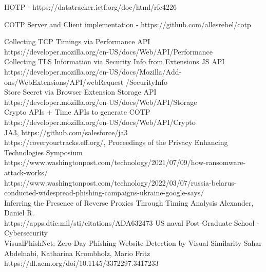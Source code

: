 \documentclass[a4paper, 11pt]{article} 				%
\begin{document}
\noindent
[8]HOTP - https://datatracker.ietf.org/doc/html/rfc4226 

\noindent
[9]COTP Server and Client implementation - https://github.com/allesrebel/cotp

\noindent
[10]Collecting TCP Timings via Performance API\\
https://developer.mozilla.org/en-US/docs/Web/API/Performance\\

\noindent
[11]Collecting TLS Information via Security Info from Extensions JS API\\
https://developer.mozilla.org/en-US/docs/Mozilla/Add-ons/WebExtensions/API/webRequest /SecurityInfo\\

\noindent
[12]Store Secret via Browser Extension Storage API\\
https://developer.mozilla.org/en-US/docs/Web/API/Storage\\

\noindent
[13]Crypto APIs + Time APIs to generate COTP\\
https://developer.mozilla.org/en-US/docs/Web/API/Crypto\\


\noindent
[14]JA3, https://github.com/salesforce/ja3\\

\noindent
[15]https://coveryourtracks.eff.org/, Proceedings of the Privacy Enhancing Technologies Symposium\\

\noindent
[16]https://www.washingtonpost.com/technology/2021/07/09/how-ransomware-attack-works/\\

\noindent
[17]https://www.washingtonpost.com/technology/2022/03/07/russia-belarus-conducted-widespread-phishing-campaigns-ukraine-google-says/\\

\noindent
[18]Inferring the Presence of Reverse Proxies Through Timing Analysis Alexander, Daniel R.\\
https://apps.dtic.mil/sti/citations/ADA632473 US naval Post-Graduate School - Cybersecurity\\

\noindent
[19]VisualPhishNet: Zero-Day Phishing Website Detection by Visual Similarity Sahar Abdelnabi, Katharina Krombholz, Mario Fritz\\
https://dl.acm.org/doi/10.1145/3372297.3417233\\
\end{document}
